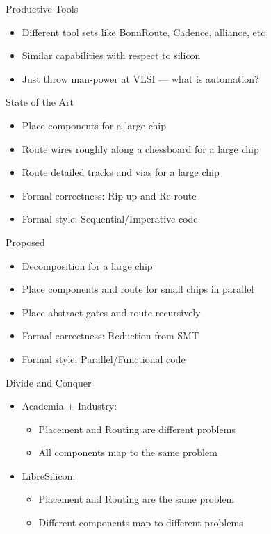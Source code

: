 \documentclass[9pt]{beamer}
\begin{document}
\begin{frame}{Productive Tools}
	\begin{itemize}
        \setlength\itemsep{1em}
		\item Different tool sets like BonnRoute, Cadence, alliance, etc
		\item Similar capabilities with respect to silicon
		\item Just throw man-power at VLSI --- what is automation?
	\end{itemize}
\end{frame}

\begin{frame}{State of the Art}
	\begin{itemize}
        \setlength\itemsep{1em}
		\item Place components for a large chip
		\item Route wires roughly along a chessboard for a large chip
		\item Route detailed tracks and vias for a large chip
		\item Formal correctness: Rip-up and Re-route
		\item Formal style: Sequential/Imperative code
	\end{itemize}
\end{frame}

\begin{frame}{Proposed}
	\begin{itemize}
        \setlength\itemsep{1em}
		\item Decomposition for a large chip
		\item Place components and route for small chips in parallel
		\item Place abstract gates and route recursively
		\item Formal correctness: Reduction from SMT
		\item Formal style: Parallel/Functional code
	\end{itemize}
\end{frame}

\begin{frame}{Divide and Conquer}
	\begin{itemize}
        \setlength\itemsep{2em}
            \item Academia + Industry:
	    \begin{itemize}
            \setlength\itemsep{1em}
		\item Placement and Routing are different problems
		\item All components map to the same problem
	    \end{itemize}
            \item LibreSilicon:
	    \begin{itemize}
            \setlength\itemsep{1em}
		\item Placement and Routing are the same problem
		\item Different components map to different problems
	    \end{itemize}
	\end{itemize}
\end{frame}
\end{document}
